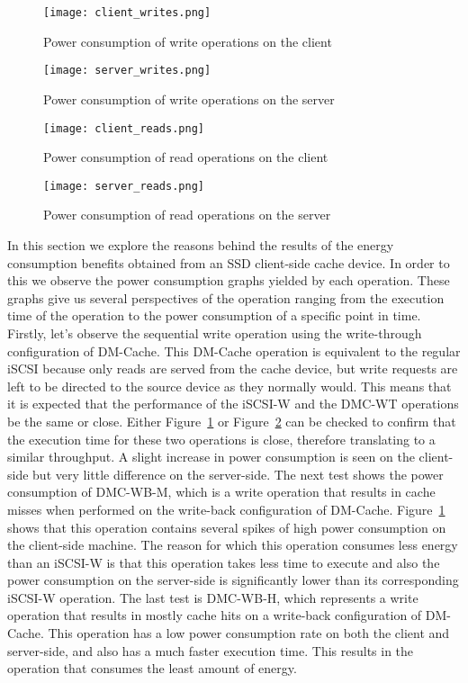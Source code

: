 \begin{figure}[t]
  \centering \texttt{[image: client\_writes.png]}
  \caption{Power consumption of write operations on the client}
  \label{fig:client-writes}
\end{figure}

\begin{figure}[t]
  \centering \texttt{[image: server\_writes.png]}
  \caption{Power consumption of write operations on the server}
  \label{fig:server-writes}
\end{figure}

\begin{figure}[t]
  \centering \texttt{[image: client\_reads.png]}
  \caption{Power consumption of read operations on the client}
  \label{fig:client-reads}
\end{figure}

\begin{figure}[t]
  \centering \texttt{[image: server\_reads.png]}
  \caption{Power consumption of read operations on the server}
  \label{fig:server-reads}
\end{figure}

In this section we explore the reasons behind the results of the energy
consumption benefits obtained from an SSD client-side cache device. In order to
this we observe the power consumption graphs yielded by each operation. These
graphs give us several perspectives of the operation ranging from the execution
time of the operation to the power consumption of a specific point in
time. Firstly, let's observe the sequential write operation using the
write-through configuration of DM-Cache. This DM-Cache operation is equivalent
to the regular iSCSI because only reads are served from the cache device, but
write requests are left to be directed to the source device as they normally
would. This means that it is expected that the performance of the iSCSI-W and
the DMC-WT operations be the same or close. Either
Figure~\ref{fig:client-writes} or Figure~\ref{fig:server-writes} can be checked
to confirm that the execution time for these two operations is close, therefore
translating to a similar throughput. A slight increase in power consumption is
seen on the client-side but very little difference on the server-side. The next
test shows the power consumption of DMC-WB-M, which is a write operation that
results in cache misses when performed on the write-back configuration of
DM-Cache. Figure~\ref{fig:client-writes} shows that this operation contains
several spikes of high power consumption on the client-side machine. The reason
for which this operation consumes less energy than an iSCSI-W is that this
operation takes less time to execute and also the power consumption on the
server-side is significantly lower than its corresponding iSCSI-W operation. The
last test is DMC-WB-H, which represents a write operation that results in mostly
cache hits on a write-back configuration of DM-Cache. This operation has a low
power consumption rate on both the client and server-side, and also has a much
faster execution time. This results in the operation that consumes the least
amount of energy.

